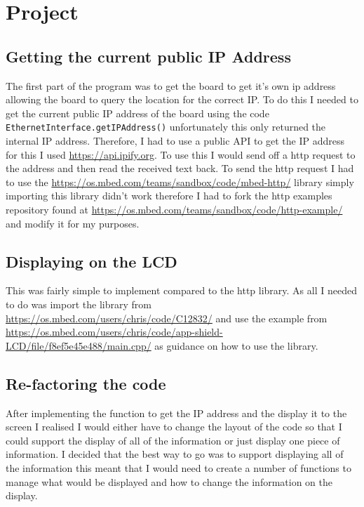 \documentclass[a4paper,12pt]{scrartcl}
\begin{document}
	\section{Project}
	{
		\subsection{Getting the current public IP Address}
		{
			The first part of the program was to get the board to get it's own ip address allowing the board to query the location for the correct IP. To do this I needed to get the current public IP address of the board using the code \lstinline|EthernetInterface.getIPAddress()| unfortunately this only returned the internal IP address. Therefore, I had to use a public API to get the IP address for this I used \url{https://api.ipify.org}\cite{Degges}. To use this I would send off a http request to the address and then read the received text back. To send the http request I had to use the \url{https://os.mbed.com/teams/sandbox/code/mbed-http/} library simply importing this library didn't work therefore I had to fork the http examples repository found at \url{https://os.mbed.com/teams/sandbox/code/http-example/} and modify it for my purposes.
		}
		\subsection{Displaying on the LCD}
		{
			This was fairly simple to implement compared to the http library. As all I needed to do was import the library from \url{https://os.mbed.com/users/chris/code/C12832/} and use the example from \url{https://os.mbed.com/users/chris/code/app-shield-LCD/file/f8ef5e45e488/main.cpp/} as guidance on how to use the library. 
		}
		\subsection{Re-factoring the code}
		{
			After implementing the function to get the IP address and the display it to the screen I realised I would either have to change the layout of the code so that I could support the display of all of the information or just display one piece of information. I decided that the best way to go was to support displaying all of the information this meant that I would need to create a number of functions to manage what would be displayed and how to change the information on the display.
		}
}
\end{document}
